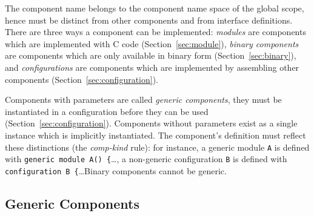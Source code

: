 \documentclass[11pt,letterpaper]{article}
\newcommand{\code}[1]{{\tt #1}}
\begin{document}
The component name belongs to the component name space of the global scope,
hence must be distinct from other components and from interface
definitions. There are three ways a component can be implemented:
\emph{modules} are components which are implemented with C code
(Section~\ref{sec:module}), \emph{binary components} are components which
are only available in binary form (Section~\ref{sec:binary}), and
\emph{configurations} are components which are implemented by assembling
other components (Section~\ref{sec:configuration}).

Components with parameters are called \emph{generic components}, they must
be instantiated in a configuration before they can be used
(Section~\ref{sec:configuration}). Components without parameters exist as a
single instance which is implicitly instantiated. The component's
definition must reflect these distinctions (the \emph{comp-kind} rule): for
instance, a generic module \code{A} is defined with \code{generic module
A() \{}\ldots, a non-generic configuration \code{B} is defined with
\code{configuration B \{}\ldots Binary components cannot be generic.

\subsection{Generic Components}
\label{sec:generic-components}
\end{document}
